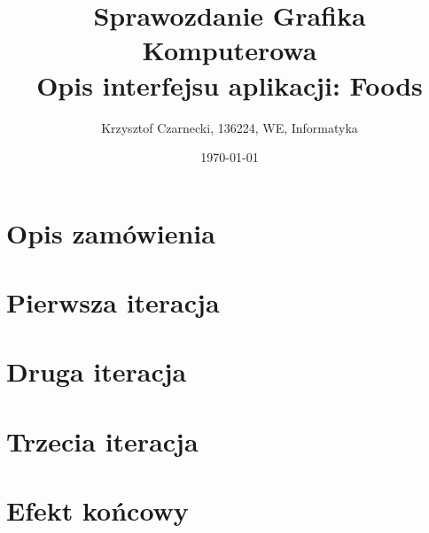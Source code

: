 \documentclass[12pt,a4paper]{article}
\begin{document}
\title{Sprawozdanie Grafika Komputerowa\\Opis interfejsu aplikacji: Foods}
\author{Krzysztof Czarnecki, 136224, WE, Informatyka}
\date{\today}

\maketitle

\tableofcontents

\section{Opis zamówienia}


\section{Pierwsza iteracja}


\section{Druga iteracja}


\section{Trzecia iteracja}


\section{Efekt końcowy}

\end{document}
